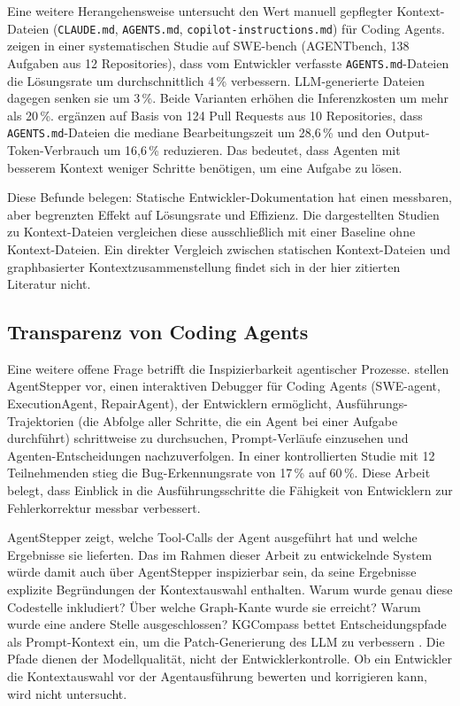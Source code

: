 Eine weitere Herangehensweise untersucht den Wert manuell gepflegter Kontext-Dateien
(\texttt{CLAUDE.md}, \texttt{AGENTS.md}, \texttt{copilot-instructions.md})
für Coding Agents.
\textcite{gloaguen2026agentsmd} zeigen in einer systematischen Studie auf SWE-bench
(AGENTbench, 138 Aufgaben aus 12 Repositories),
dass vom Entwickler verfasste \texttt{AGENTS.md}-Dateien
die Lösungsrate um durchschnittlich 4\,\% verbessern.
LLM-generierte Dateien dagegen senken sie um 3\,\%.
Beide Varianten erhöhen die Inferenzkosten um mehr als 20\,\%.
\textcite{lulla2026agentsmd} ergänzen auf Basis von 124 Pull Requests aus 10 Repositories,
dass \texttt{AGENTS.md}-Dateien die mediane Bearbeitungszeit um 28,6\,\%
und den Output-Token-Verbrauch um 16,6\,\% reduzieren. 
Das bedeutet, dass Agenten mit besserem Kontext weniger Schritte benötigen, um eine Aufgabe zu lösen.

Diese Befunde belegen: Statische Entwickler-Dokumentation hat einen messbaren,
aber begrenzten Effekt auf Lösungsrate und Effizienz.
Die dargestellten Studien zu Kontext-Dateien vergleichen diese
ausschließlich mit einer Baseline ohne Kontext-Dateien.
Ein direkter Vergleich zwischen statischen Kontext-Dateien
und graphbasierter Kontextzusammenstellung findet sich
in der hier zitierten Literatur nicht.

\subsection*{Transparenz von Coding Agents}

Eine weitere offene Frage betrifft die Inspizierbarkeit agentischer Prozesse.
\textcite{agentstepper2026} stellen AgentStepper vor,
einen interaktiven Debugger für Coding Agents (SWE-agent, ExecutionAgent, RepairAgent),
der Entwicklern ermöglicht, Ausführungs-Trajektorien
(die Abfolge aller Schritte, die ein Agent bei einer Aufgabe durchführt)
schrittweise zu durchsuchen, Prompt-Verläufe einzusehen
und Agenten-Entscheidungen nachzuverfolgen.
In einer kontrollierten Studie mit 12 Teilnehmenden
stieg die Bug-Erkennungsrate von 17\,\% auf 60\,\%.
Diese Arbeit belegt, dass Einblick in die Ausführungsschritte
die Fähigkeit von Entwicklern zur Fehlerkorrektur messbar verbessert.

AgentStepper zeigt, welche Tool-Calls der Agent ausgeführt hat
und welche Ergebnisse sie lieferten.
Das im Rahmen dieser Arbeit zu entwickelnde System würde damit
auch über AgentStepper inspizierbar sein,
da seine Ergebnisse explizite Begründungen der Kontextauswahl enthalten.
Warum wurde genau diese Codestelle inkludiert?
Über welche Graph-Kante wurde sie erreicht?
Warum wurde eine andere Stelle ausgeschlossen?
KGCompass bettet Entscheidungspfade als Prompt-Kontext ein,
um die Patch-Generierung des LLM zu verbessern \parencite{yang2025kgcompass}.
Die Pfade dienen der Modellqualität, nicht der Entwicklerkontrolle.
Ob ein Entwickler die Kontextauswahl vor der Agentausführung bewerten
und korrigieren kann, wird nicht untersucht.


